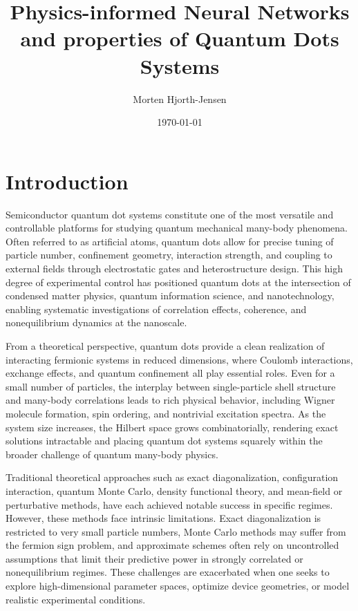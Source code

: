 \documentclass[superscriptaddress,unsortedaddress,amsmath,amssymb,aps]{revtex4-2}
\begin{document}
\title{Physics-informed Neural Networks and properties of Quantum Dots Systems}



\author{Morten Hjorth-Jensen}



\date{\today}


\maketitle

\section{Introduction}


Semiconductor quantum dot systems constitute one of the most versatile
and controllable platforms for studying quantum mechanical many-body
phenomena. Often referred to as artificial atoms, quantum dots allow
for precise tuning of particle number, confinement geometry,
interaction strength, and coupling to external fields through
electrostatic gates and heterostructure design. This high degree of
experimental control has positioned quantum dots at the intersection
of condensed matter physics, quantum information science, and
nanotechnology, enabling systematic investigations of correlation
effects, coherence, and nonequilibrium dynamics at the nanoscale.

From a theoretical perspective, quantum dots provide a clean
realization of interacting fermionic systems in reduced dimensions,
where Coulomb interactions, exchange effects, and quantum confinement
all play essential roles. Even for a small number of particles, the
interplay between single-particle shell structure and many-body
correlations leads to rich physical behavior, including Wigner
molecule formation, spin ordering, and nontrivial excitation
spectra. As the system size increases, the Hilbert space grows
combinatorially, rendering exact solutions intractable and placing
quantum dot systems squarely within the broader challenge of quantum
many-body physics.

Traditional theoretical approaches such as exact diagonalization,
configuration interaction, quantum Monte Carlo, density functional
theory, and mean-field or perturbative methods, have each achieved
notable success in specific regimes. However, these methods face
intrinsic limitations. Exact diagonalization is restricted to very
small particle numbers, Monte Carlo methods may suffer from the
fermion sign problem, and approximate schemes often rely on
uncontrolled assumptions that limit their predictive power in strongly
correlated or nonequilibrium regimes. These challenges are exacerbated
when one seeks to explore high-dimensional parameter spaces, optimize
device geometries, or model realistic experimental conditions.
\end{document}

